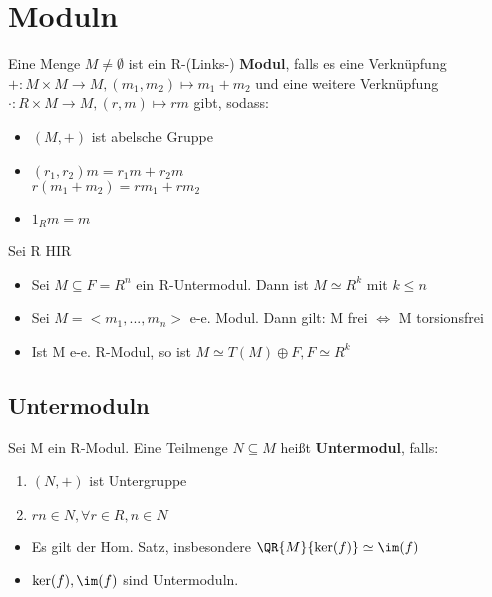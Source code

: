 \section{Moduln}
\begin{definition}
Eine Menge $M \neq \emptyset$ ist ein R-(Links-) \textbf{Modul}, falls es eine Verknüpfung $+:M \times M \rightarrow M, (m_1,m_2) \mapsto m_1+m_2$ und eine weitere Verknüpfung $\cdot:R \times M \rightarrow M, (r,m) \mapsto rm$ gibt, sodass:
\begin{itemize}
	\item $(M,+)$ ist abelsche Gruppe
	\item $(r_1,r_2)m = r_1 m + r_2 m$\\$r(m_1+m_2) = rm_1+rm_2$
	\item $1_R m = m$
\end{itemize}
\end{definition}
\begin{remark}
Sei R HIR
\begin{itemize}
	\item Sei $ M \subseteq F = R^n$ ein R-Untermodul. Dann ist $M \simeq R^k$ mit $k \leq n$
	\item Sei $M=<m_1,...,m_n>$ e-e. Modul. Dann gilt: M frei $\Leftrightarrow$ M torsionsfrei
	\item Ist M e-e. R-Modul, so ist $M \simeq T(M) \oplus F, F \simeq R^k$
\end{itemize}
\end{remark}

\subsection{Untermoduln}
\begin{definition}
Sei M ein R-Modul. Eine Teilmenge $N \subseteq M$ heißt \textbf{Untermodul}, falls:
\begin{enumerate}
	\item $(N,+)$ ist Untergruppe
	\item $rn \in N, \forall r \in R, n\in N$
\end{enumerate}
\end{definition}

\begin{remark}
\leavevmode
\begin{itemize}
	\item Es gilt der Hom. Satz, insbesondere $\QR{M}{\ker(f)} \simeq \im(f)$
	\item $\ker(f),\im(f)$ sind Untermoduln.
\end{itemize}
\end{remark}


